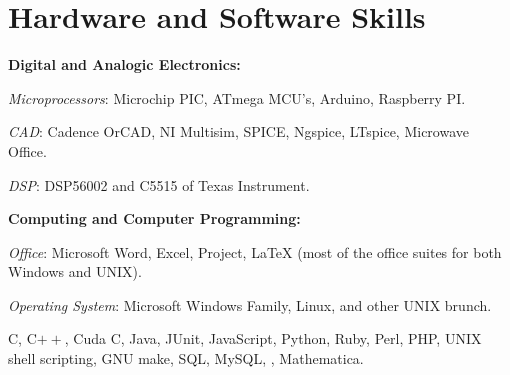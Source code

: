 \section{Hardware and Software Skills}
\textbf{Digital and Analogic Electronics:}
\begin{innerlist}
   \item \textit{Microprocessors}: Microchip PIC, ATmega MCU's, Arduino, Raspberry PI.
   \item \textit{CAD}: Cadence OrCAD, NI Multisim, SPICE, Ngspice, LTspice, Microwave Office.
   \item \textit{DSP}: DSP56002 and C5515 of Texas Instrument.
\end{innerlist}
%
%
%
%
%
%
\textbf{Computing and Computer Programming:}
\begin{innerlist}
	\item \textit{Office}: Microsoft Word, Excel, Project, \LaTeX{} (most of the office suites for both Windows and UNIX).
	\item \textit{Operating System}: Microsoft Windows Family, Linux, and other UNIX brunch.
    \item C, C$++$, Cuda C, Java, JUnit, JavaScript, Python, Ruby, Perl, PHP, UNIX shell scripting, GNU make, SQL, MySQL, \Matlab, Mathematica.
\end{innerlist}
%
%

